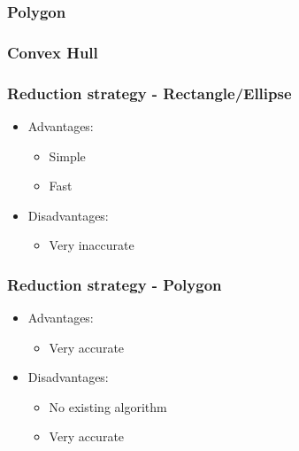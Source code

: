 \subsubsection{Polygon}
\subsubsection{Convex Hull}
\begin{frame}
\frametitle{Reduction strategy - Rectangle/Ellipse}
\begin{multicols}{2}
	\begin{itemize}
		\item Advantages:
		\begin{itemize}
			\item Simple
			\item Fast
		\end{itemize}
	\end{itemize}
\columnbreak
	\begin{itemize}
		\item Disadvantages:
		\begin{itemize}
			\item Very inaccurate
			\linebreak
		\end{itemize}
	\end{itemize}
\end{multicols}

\end{frame}
\begin{frame}
\frametitle{Reduction strategy - Polygon}
\begin{multicols}{2}
	\begin{itemize}
		\item Advantages:
		\begin{itemize}
			\item Very accurate
			\linebreak
		\end{itemize}
	\end{itemize}
\columnbreak
	\begin{itemize}
		\item Disadvantages:
		\begin{itemize}
			\item No existing algorithm
			\item Very accurate
		\end{itemize}
	\end{itemize}
\end{multicols}

\end{frame}
